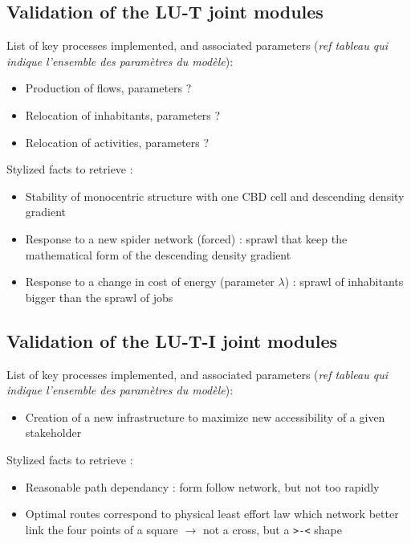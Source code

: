 \subsection{Validation of the LU-T joint modules}

List of key processes implemented, and associated parameters (\textit{ref tableau qui indique l'ensemble des paramètres du modèle}):
\begin{itemize}
\item Production of flows, parameters ?
\item Relocation of inhabitants, parameters ?
\item Relocation of activities, parameters ?
\end{itemize}


Stylized facts to retrieve : 
\begin{itemize}
	\item Stability of monocentric structure with one CBD cell and descending density gradient
	\item Response to a new spider network (forced) : sprawl that keep the mathematical form of the descending density gradient
	\item Response to a change in cost of energy (parameter $\lambda$) : sprawl of inhabitants bigger than the sprawl of jobs
\end{itemize}





\subsection{Validation of the LU-T-I joint modules}

List of key processes implemented, and associated parameters (\textit{ref tableau qui indique l'ensemble des paramètres du modèle}):
\begin{itemize}
\item Creation of a new infrastructure to maximize new accessibility of a given stakeholder
\end{itemize}

Stylized facts to retrieve :
\begin{itemize}
	\item Reasonable path dependancy : form follow network, but not too rapidly
	\item Optimal routes correspond to physical least effort law which network better link the four points of a square $\rightarrow$ not a cross, but a \texttt{>-<} shape
\end{itemize}





